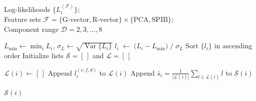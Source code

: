\documentclass[%
aip,
 amsmath,amssymb,
reprint,%
onecolumn,
]{revtex4-1}
\begin{document}
{\begin{algorithm}[H]
  \caption{RNAnneal Score}
  \label{alg:rnanneal-score}
  \begin{algorithmic}[1]
    \REQUIRE  
    Log-likelihoods $\{L_{i}^{(\mathcal{F})}\}$;\\
    Feature sets $\mathcal{F}=\{\text{G-vector},\text{R-vector}\}\times\{\text{PCA},\text{SPIB}\}$;\\
    Component range $\mathcal{D}=2,3,\ldots,8$

    \STATE $\displaystyle L_{\min}\leftarrow\min_{i}L_{i}$,\quad 
           $\displaystyle\sigma_{L}\leftarrow\sqrt{\operatorname{Var}\{L_{i}\}}$
      \STATE $\displaystyle l_{i}\;\leftarrow\;
              {\bigl(L_{i}-L_{\min}\bigr)}\;
              {/\;\sigma_{L}}$ 
    \ENDFOR
      \STATE Sort $\{l_{i}\}$ in ascending order
      \STATE Initialize lists $\mathcal{S} = [\,]$ and $\mathcal{L} = [\,]$
    
        \STATE $\mathcal{L}(i)\gets[\,]$
              \STATE Append $l_{i}^{(v,f,d)}$ to $\mathcal{L}(i)$
            \ENDFOR
          \ENDFOR
        \STATE Append {$\displaystyle\bar{s}_{i}
               = \frac{1}{|\mathcal{L}(i)|}\sum_{l\in\mathcal{L}(i)}l$} to ${\mathcal{S}}(i)$
       
      \ENDFOR
      \RETURN ${\mathcal{S}}(i)$
  \end{algorithmic}
\end{algorithm}



}
\end{document}
